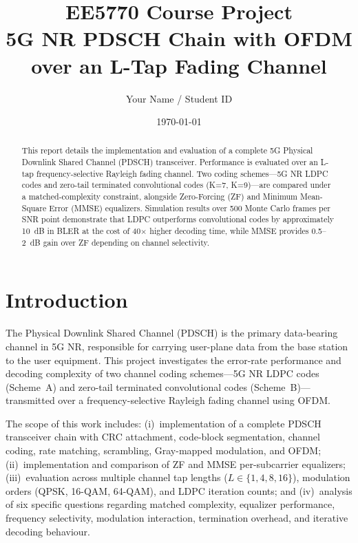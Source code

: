 \documentclass[12pt, a4paper]{article}
\title{\textbf{EE5770 Course Project}\\ 5G NR PDSCH Chain with OFDM over an L-Tap Fading Channel}
\author{Your Name / Student ID}
\date{\today}
\begin{document}
\maketitle

\begin{abstract}
This report details the implementation and evaluation of a complete 5G Physical Downlink Shared Channel (PDSCH) transceiver. Performance is evaluated over an L-tap frequency-selective Rayleigh fading channel. Two coding schemes---5G NR LDPC codes and zero-tail terminated convolutional codes (K=7, K=9)---are compared under a matched-complexity constraint, alongside Zero-Forcing (ZF) and Minimum Mean-Square Error (MMSE) equalizers. Simulation results over 500 Monte Carlo frames per SNR point demonstrate that LDPC outperforms convolutional codes by approximately 10~dB in BLER at the cost of 40$\times$ higher decoding time, while MMSE provides 0.5--2~dB gain over ZF depending on channel selectivity.
\end{abstract}

\newpage
\tableofcontents
\newpage

\section{Introduction}
The Physical Downlink Shared Channel (PDSCH) is the primary data-bearing channel in 5G NR, responsible for carrying user-plane data from the base station to the user equipment. This project investigates the error-rate performance and decoding complexity of two channel coding schemes---5G NR LDPC codes (Scheme~A) and zero-tail terminated convolutional codes (Scheme~B)---transmitted over a frequency-selective Rayleigh fading channel using OFDM.

The scope of this work includes: (i)~implementation of a complete PDSCH transceiver chain with CRC attachment, code-block segmentation, channel coding, rate matching, scrambling, Gray-mapped modulation, and OFDM; (ii)~implementation and comparison of ZF and MMSE per-subcarrier equalizers; (iii)~evaluation across multiple channel tap lengths ($L \in \{1,4,8,16\}$), modulation orders (QPSK, 16-QAM, 64-QAM), and LDPC iteration counts; and (iv)~analysis of six specific questions regarding matched complexity, equalizer performance, frequency selectivity, modulation interaction, termination overhead, and iterative decoding behaviour.

\end{document}
